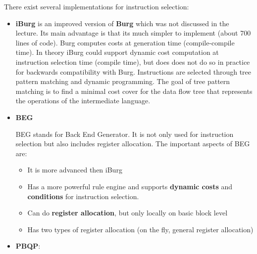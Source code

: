 \documentclass[a4paper,10pt]{article}
\begin{document}
There exist several implementations for instruction selection:
\begin{itemize}
 \item \textbf{iBurg} is an improved version of \textbf{Burg} which was not discussed in the lecture. Its main advantage is that its much 
       simpler to implement (about 700 lines of code). Burg computes costs at generation time (compile-compile time). In theory iBurg 
       could support dynamic cost computation at instruction selection time (compile time), but does does not do so in practice for 
       backwards compatibility with Burg. Instructions are selected through tree pattern matching and dynamic programming. The goal of 
       tree pattern matching is to find a minimal cost cover for the data flow tree that represents the operations of the intermediate 
       language.
 \item \textbf{BEG}

BEG stands for Back End Generator. It is not only used for instruction selection but also includes register allocation. The important 
aspects of BEG are:
    \begin{itemize}
    \item It is more advanced then iBurg
    \item Has a more powerful rule engine and supports \textbf{dynamic costs} and \textbf{conditions} for instruction selection. 
    \item Can do \textbf{register allocation}, but only locally on basic block level
    \item Has two types of register allocation (on the fly, general register allocation)
    \end{itemize}

 \item \textbf{PBQP}: 
       

\end{itemize}
\end{document}

